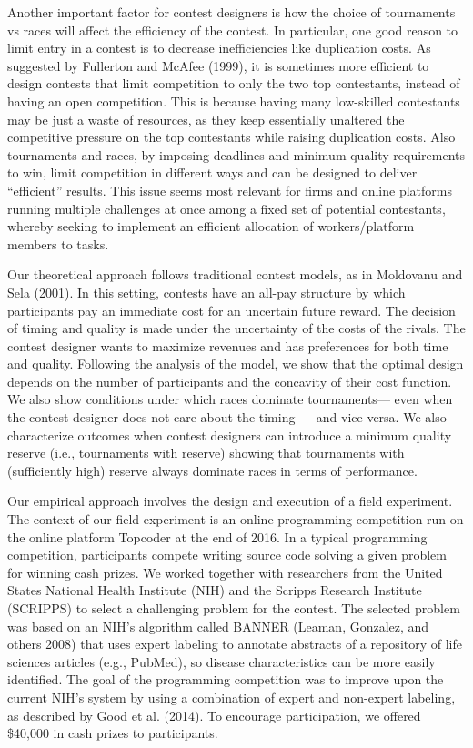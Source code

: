 \documentclass[11pt, titlepage]{article}
\begin{document}
Another important factor for contest designers is how the choice of
tournaments vs races will affect the efficiency of the contest. In
particular, one good reason to limit entry in a contest is to decrease
inefficiencies like duplication costs. As suggested by Fullerton and
McAfee (1999), it is sometimes more efficient to design contests that
limit competition to only the two top contestants, instead of having an
open competition. This is because having many low-skilled contestants
may be just a waste of resources, as they keep essentially unaltered the
competitive pressure on the top contestants while raising duplication
costs. Also tournaments and races, by imposing deadlines and minimum
quality requirements to win, limit competition in different ways and can
be designed to deliver ``efficient'' results. This issue seems most
relevant for firms and online platforms running multiple challenges at
once among a fixed set of potential contestants, whereby seeking to
implement an efficient allocation of workers/platform members to tasks.

Our theoretical approach follows traditional contest models, as in
Moldovanu and Sela (2001). In this setting, contests have an all-pay
structure by which participants pay an immediate cost for an uncertain
future reward. The decision of timing and quality is made under the
uncertainty of the costs of the rivals. The contest designer wants to
maximize revenues and has preferences for both time and quality.
Following the analysis of the model, we show that the optimal design
depends on the number of participants and the concavity of their cost
function. We also show conditions under which races dominate
tournaments--- even when the contest designer does not care about the
timing --- and vice versa. We also characterize outcomes when contest
designers can introduce a minimum quality reserve (i.e., tournaments
with reserve) showing that tournaments with (sufficiently high) reserve
always dominate races in terms of performance.

Our empirical approach involves the design and execution of a field
experiment. The context of our field experiment is an online programming
competition run on the online platform Topcoder at the end of 2016. In a
typical programming competition, participants compete writing source
code solving a given problem for winning cash prizes. We worked together
with researchers from the United States National Health Institute (NIH)
and the Scripps Research Institute (SCRIPPS) to select a challenging
problem for the contest. The selected problem was based on an NIH's
algorithm called BANNER (Leaman, Gonzalez, and others 2008) that uses
expert labeling to annotate abstracts of a repository of life sciences
articles (e.g., PubMed), so disease characteristics can be more easily
identified. The goal of the programming competition was to improve upon
the current NIH's system by using a combination of expert and non-expert
labeling, as described by Good et al. (2014). To encourage
participation, we offered \$40,000 in cash prizes to participants.
\end{document}
